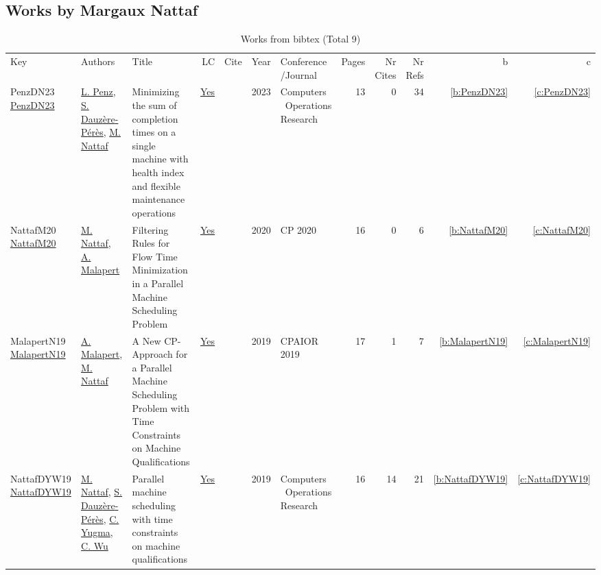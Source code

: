 \subsection{Works by Margaux Nattaf}
\label{sec:a81}
{\scriptsize
\begin{longtable}{>{\raggedright\arraybackslash}p{3cm}>{\raggedright\arraybackslash}p{6cm}>{\raggedright\arraybackslash}p{6.5cm}rrrp{2.5cm}rrrrr}
\rowcolor{white}\caption{Works from bibtex (Total 9)}\\ \toprule
\rowcolor{white}Key & Authors & Title & LC & Cite & Year & \shortstack{Conference\\/Journal} & Pages & \shortstack{Nr\\Cites} & \shortstack{Nr\\Refs} & b & c \\ \midrule\endhead
\bottomrule
\endfoot
PenzDN23 \href{https://doi.org/10.1016/j.cor.2022.106092}{PenzDN23} & \hyperref[auth:a1019]{L. Penz}, \hyperref[auth:a1020]{S. Dauz{\`{e}}re{-}P{\'{e}}r{\`{e}}s}, \hyperref[auth:a81]{M. Nattaf} & Minimizing the sum of completion times on a single machine with health index and flexible maintenance operations & \href{works/PenzDN23.pdf}{Yes} & \cite{PenzDN23} & 2023 & Computers \  Operations Research & 13 & 0 & 34 & \ref{b:PenzDN23} & \ref{c:PenzDN23}\\
NattafM20 \href{https://doi.org/10.1007/978-3-030-58475-7\_27}{NattafM20} & \hyperref[auth:a81]{M. Nattaf}, \hyperref[auth:a82]{A. Malapert} & Filtering Rules for Flow Time Minimization in a Parallel Machine Scheduling Problem & \href{works/NattafM20.pdf}{Yes} & \cite{NattafM20} & 2020 & CP 2020 & 16 & 0 & 6 & \ref{b:NattafM20} & \ref{c:NattafM20}\\
MalapertN19 \href{https://doi.org/10.1007/978-3-030-19212-9\_28}{MalapertN19} & \hyperref[auth:a82]{A. Malapert}, \hyperref[auth:a81]{M. Nattaf} & A New CP-Approach for a Parallel Machine Scheduling Problem with Time Constraints on Machine Qualifications & \href{works/MalapertN19.pdf}{Yes} & \cite{MalapertN19} & 2019 & CPAIOR 2019 & 17 & 1 & 7 & \ref{b:MalapertN19} & \ref{c:MalapertN19}\\
NattafDYW19 \href{https://doi.org/10.1016/j.cor.2019.03.004}{NattafDYW19} & \hyperref[auth:a81]{M. Nattaf}, \hyperref[auth:a1020]{S. Dauz{\`{e}}re{-}P{\'{e}}r{\`{e}}s}, \hyperref[auth:a1021]{C. Yugma}, \hyperref[auth:a1022]{C. Wu} & Parallel machine scheduling with time constraints on machine qualifications & \href{works/NattafDYW19.pdf}{Yes} & \cite{NattafDYW19} & 2019 & Computers \  Operations Research & 16 & 14 & 21 & \ref{b:NattafDYW19} & \ref{c:NattafDYW19}\\

\end{longtable}}
